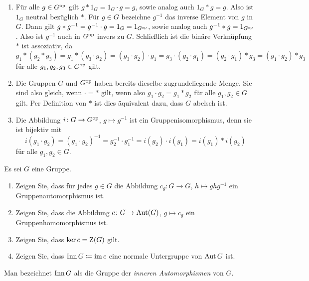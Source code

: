 \begin{solution}
  \begin{enumerate}
    \item
      Für alle $g \in G^{\operatorname{op}}$ gilt $g * 1_G = 1_G \cdot g = g$, sowie analog auch $1_G * g = g$.
      Also ist $1_G$ neutral bezüglich $*$.
      Für $g \in G$ bezeichne $g^{-1}$ das inverse Element von $g$ in $G$.
      Dann gilt $g * g^{-1} = g^{-1} \cdot g = 1_G = 1_{G^{\operatorname{op}}}$, sowie analog auch $g^{-1} * g = 1_{G^{\operatorname{op}}}$.
      Also ist $g^{-1}$ auch in $G^{\operatorname{op}}$ invers zu $G$.
      Schließlich ist die binäre Verknüpfung $*$ ist assoziativ, da
      \[
          g_1 * (g_2 * g_3)
        = g_1 * (g_3 \cdot g_2)
        = (g_3 \cdot g_2) \cdot g_1
        = g_3 \cdot (g_2 \cdot g_1)
        = (g_2 \cdot g_1) * g_3
        = (g_1 \cdot g_2) * g_3
      \]
      für alle $g_1, g_2, g_3 \in G^{\operatorname{op}}$ gilt.
    \item
      Die Gruppen $G$ und $G^{\operatorname{op}}$ haben bereits dieselbe zugrundeliegende Menge.
      Sie sind also gleich, wenn $\cdot = *$ gilt, wenn also $g_1 \cdot g_2 = g_1 * g_2$ für alle $g_1, g_2 \in G$ gilt.
      Per Definition von $*$ ist dies äquivalent dazu, dass $G$ abelsch ist.
    \item
      Die Abbildung $i \colon G \to G^{\operatorname{op}}$, $g \mapsto g^{-1}$ ist ein Gruppenisomorphismus, denn sie ist bijektiv mit
      \[
          i(g_1 \cdot g_2)
        = (g_1 \cdot g_2)^{-1}
        = g_2^{-1} \cdot g_1^{-1}
        = i(g_2) \cdot i(g_1)
        = i(g_1) * i(g_2)
      \]
      für alle $g_1, g_2 \in G$.
  \end{enumerate}
\end{solution}


\begin{question}[subtitle = Innere Automorphismen]
  \label{question: inner automorphims}
  Es sei $G$ eine Gruppe.
  \begin{enumerate}
    \item
      Zeigen Sie, dass für jedes $g \in G$ die Abbildung $c_g \colon G \to G$, $h \mapsto g h g^{-1}$ ein Gruppenautomorphismus ist.
    \item
      Zeigen Sie, dass die Abbildung $c \colon G \to \operatorname{Aut}(G)$, $g \mapsto c_g$ ein Gruppenhomomorphismus ist.
    \item
      Zeigen Sie, dass $\ker c = \operatorname{Z}(G)$ gilt.
    \item
      Zeigen Sie, dass $\operatorname{Inn} G \coloneqq \operatorname{im} c$ eine normale Untergruppe von $\operatorname{Aut} G$ ist.
  \end{enumerate}
  Man bezeichnet $\operatorname{Inn} G$ als die Gruppe der \emph{inneren Automorphismen} von $G$.
\end{question}


